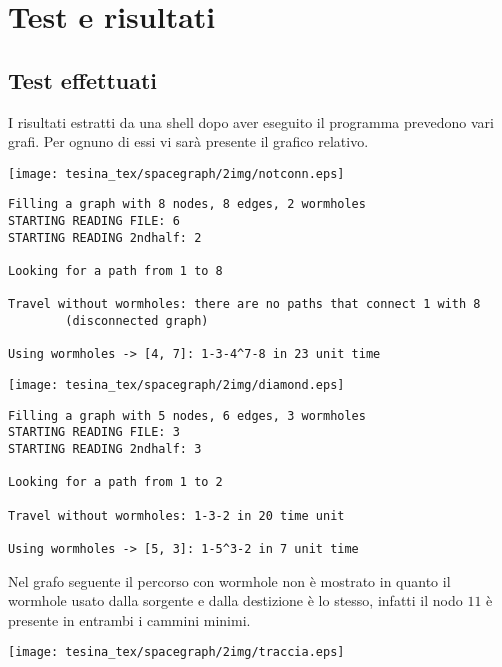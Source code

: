 \def\baselinestretch{1}
\section{Test e risultati}
\def\baselinestretch{1.66}
\thispagestyle{headings}

\subsection{Test effettuati}
I risultati estratti da una shell dopo aver eseguito il programma prevedono vari grafi. Per ognuno
di essi vi sar\`a presente il grafico relativo.

\begin{center}
\texttt{[image: tesina\_tex/spacegraph/2img/notconn.eps]}
\end{center}

\begin{verbatim}
Filling a graph with 8 nodes, 8 edges, 2 wormholes
STARTING READING FILE: 6
STARTING READING 2ndhalf: 2

Looking for a path from 1 to 8

Travel without wormholes: there are no paths that connect 1 with 8
        (disconnected graph)

Using wormholes -> [4, 7]: 1-3-4^7-8 in 23 unit time
\end{verbatim}

\newpage

\begin{center}
\texttt{[image: tesina\_tex/spacegraph/2img/diamond.eps]}
\end{center}

\begin{verbatim}
Filling a graph with 5 nodes, 6 edges, 3 wormholes
STARTING READING FILE: 3
STARTING READING 2ndhalf: 3

Looking for a path from 1 to 2

Travel without wormholes: 1-3-2 in 20 time unit

Using wormholes -> [5, 3]: 1-5^3-2 in 7 unit time
\end{verbatim}



\newpage Nel grafo seguente il percorso con wormhole non \`e mostrato in quanto il wormhole
usato dalla sorgente e dalla destizione \`e lo stesso, infatti il nodo $11$ \`e presente
in entrambi i cammini minimi.
\begin{center}
\texttt{[image: tesina\_tex/spacegraph/2img/traccia.eps]}
\end{center}

